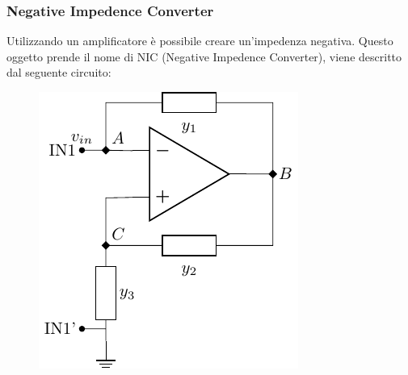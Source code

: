 \documentclass{article}
\numberwithin{equation}{subsection}
\begin{document}
\subsubsection{Negative Impedence Converter}

Utilizzando un amplificatore è possibile creare un'impedenza negativa. Questo oggetto prende il nome di NIC (Negative Impedence Converter), 
viene descritto dal seguente circuito:
\begin{figure}[H]%
    \centering
    \includegraphics{amplificatore-nic.pdf}%
    \label{fig:amplificatore-nic}
\end{figure}
\end{document}
